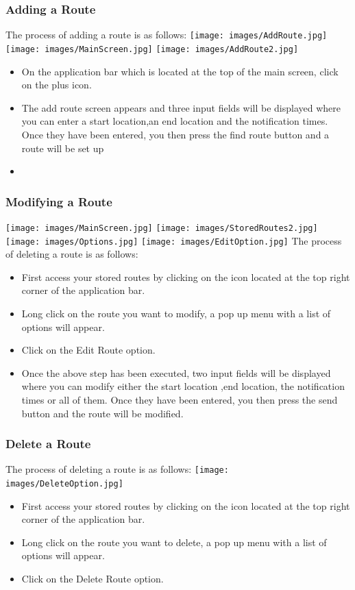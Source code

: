 \documentclass[a4paper,12pt]{article}
\begin{document}
\subsubsection{Adding a Route}
The process of adding a route is as follows:
\texttt{[image: images/AddRoute.jpg]}
\texttt{[image: images/MainScreen.jpg]}
\texttt{[image: images/AddRoute2.jpg]}
\begin{itemize}
    \item On the application bar which is located at the top of the main screen, click on the plus icon.
    \item The add route screen appears and three input fields will be displayed  where you can enter a start location,an end location and the notification times. Once they have been entered, you then press the find route button and a route will be set up
    \item 
\end{itemize}
\subsubsection{Modifying a Route}
\texttt{[image: images/MainScreen.jpg]}
\texttt{[image: images/StoredRoutes2.jpg]}
\texttt{[image: images/Options.jpg]}
\texttt{[image: images/EditOption.jpg]}
The process of deleting a route is as follows:
\begin{itemize}
    \item First access your stored routes by  clicking on the icon located at the top right corner of the application bar. 
    \item Long click on the route you want to modify, a pop up menu with a list of options will appear.
    \item Click on the Edit Route option.
    \item Once the above step has been executed, two input fields will be displayed  where you can modify either the start location ,end location, the notification times  or all of them. Once they have been entered, you then press the send button and the route will be modified.
\end{itemize}
\subsubsection{Delete a Route}
The process of deleting a route is as follows:
\texttt{[image: images/DeleteOption.jpg]}
\begin{itemize}
    \item First access your stored routes by  clicking on the icon located at the top right corner of the application bar. 
    \item Long click on the route you want to delete, a pop up menu with a list of options will appear.
    \item Click on the Delete Route option.
\end{itemize}
\end{document}
